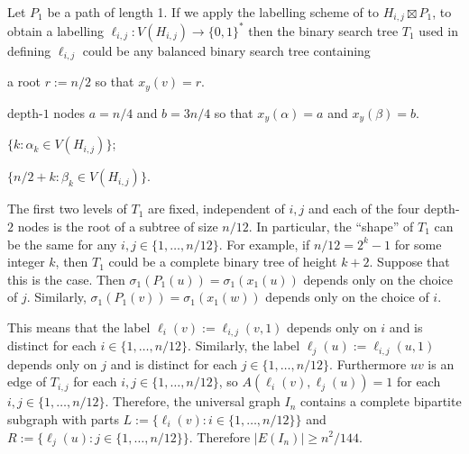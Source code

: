 \documentclass{patmorin}
\begin{document}
Let $P_1$ be a path of length 1.  If we apply the labelling scheme of \citet{dujmovic.esperet.ea:adjacency} to $H_{i,j}\boxtimes P_1$, to obtain a labelling $\ell_{i,j}:V(H_{i,j})\to\{0,1\}^*$ then the binary search tree $T_{1}$ used in defining $\ell_{i,j}$ could be any balanced binary search tree containing
\begin{compactenum}
    \item a root $r:=n/2$ so that $x_y(v)=r$.
    \item depth-$1$ nodes $a=n/4$ and $b=3n/4$ so that $x_y(\alpha)=a$ and $x_y(\beta)=b$.
    \item $\{k:\alpha_k \in V(H_{i,j})\}$;
    \item $\{n/2+k:\beta_k\in V(H_{i,j})\}$.
\end{compactenum}

The first two levels of $T_1$ are fixed, independent of $i,j$ and each of the four depth-$2$ nodes is the root of a subtree of size $n/12$. In particular, the ``shape'' of $T_{1}$ can be the same for any $i,j\in\{1,\ldots,n/12\}$.  For example, if $n/12=2^k-1$ for some integer $k$, then $T_1$ could be a complete binary tree of height $k+2$.  Suppose that this is the case.  Then $\sigma_1(P_1(u))=\sigma_1(x_1(u))$ depends only on the choice of $j$.  Similarly, $\sigma_1(P_1(v))=\sigma_1(x_1(w))$ depends only on the choice of $i$.

This means that the label $\ell_{i}(v):=\ell_{i,j}(v,1)$ depends only on $i$ and is distinct for each $i\in\{1,\ldots,n/12\}$.  Similarly, the label $\ell_j(u):=\ell_{i,j}(u,1)$ depends only on $j$ and is distinct for each $j\in\{1,\ldots,n/12\}$.  Furthermore $uv$ is an edge of $T_{i,j}$ for each $i,j\in\{1,\ldots,n/12\}$, so $A(\ell_{i}(v),\ell_{j}(u))=1$ for each $i,j\in\{1,\ldots,n/12\}$. Therefore, the universal graph $I_n$ contains a complete bipartite subgraph with parts $L:=\{\ell_{i}(v):i\in\{1,\ldots,n/12\}\}$ and $R:=\{\ell_{j}(u):j\in\{1,\ldots,n/12\}\}$.  Therefore $|E(I_n)|\ge n^2/144$.
\end{document}
